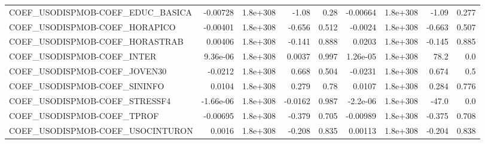 \begin{tabular}{lrrrrrrrr}
COEF\_USODISPMOB-COEF\_EDUC\_BASICA  &    -0.00728 &     1.8e+308 &     -1.08 &     0.28 &   -0.00664 &    1.8e+308 &        -1.09 &         0.277 \\
COEF\_USODISPMOB-COEF\_HORAPICO     &    -0.00401 &     1.8e+308 &    -0.656 &    0.512 &    -0.0024 &    1.8e+308 &       -0.663 &         0.507 \\
COEF\_USODISPMOB-COEF\_HORASTRAB    &     0.00406 &     1.8e+308 &    -0.141 &    0.888 &     0.0203 &    1.8e+308 &       -0.145 &         0.885 \\
COEF\_USODISPMOB-COEF\_INTER        &    9.36e-06 &     1.8e+308 &    0.0037 &    0.997 &   1.26e-05 &    1.8e+308 &         78.2 &           0.0 \\
COEF\_USODISPMOB-COEF\_JOVEN30      &     -0.0212 &     1.8e+308 &     0.668 &    0.504 &    -0.0231 &    1.8e+308 &        0.674 &           0.5 \\
COEF\_USODISPMOB-COEF\_SININFO      &      0.0104 &     1.8e+308 &     0.279 &     0.78 &     0.0107 &    1.8e+308 &        0.284 &         0.776 \\
COEF\_USODISPMOB-COEF\_STRESSF4     &   -1.66e-06 &     1.8e+308 &   -0.0162 &    0.987 &   -2.2e-06 &    1.8e+308 &        -47.0 &           0.0 \\
COEF\_USODISPMOB-COEF\_TPROF        &    -0.00695 &     1.8e+308 &    -0.379 &    0.705 &   -0.00989 &    1.8e+308 &       -0.375 &         0.708 \\
COEF\_USODISPMOB-COEF\_USOCINTURON  &      0.0016 &     1.8e+308 &    -0.208 &    0.835 &    0.00113 &    1.8e+308 &       -0.204 &         0.838 \\
\bottomrule
\end{tabular}
